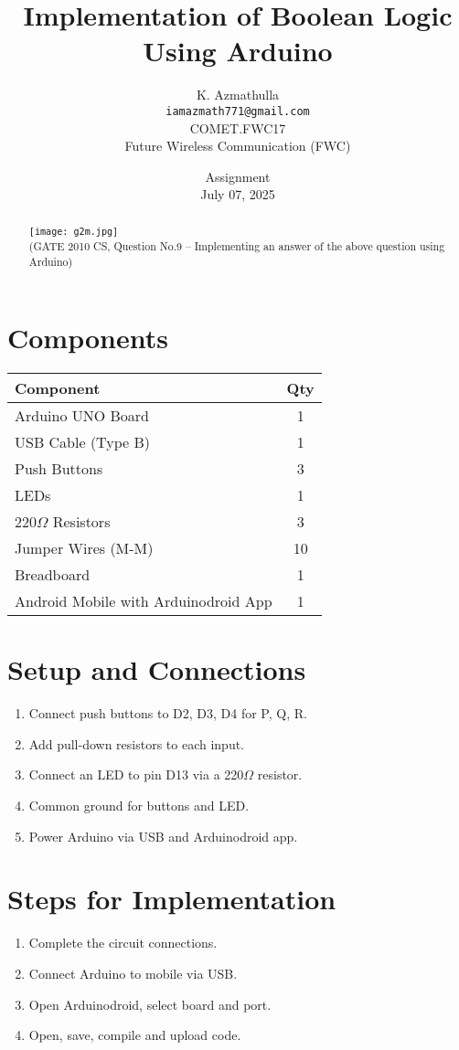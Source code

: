 \documentclass[12pt]{article}
\title{Implementation of Boolean Logic Using Arduino}
\author{K. Azmathulla\\\texttt{iamazmath771@gmail.com}\\COMET.FWC17\\Future Wireless Communication (FWC)}
\date{Assignment\\July 07, 2025}
\begin{document}
\maketitle

\begin{abstract}
\texttt{[image: g2m.jpg]} \\[0.5em]
(GATE 2010 CS, Question No.9 – Implementing an answer of the above question using Arduino)
\end{abstract}

\section{Components}

\begin{tabular}{|l|c|}
\hline
\textbf{Component} & \textbf{Qty} \\
\hline
Arduino UNO Board & 1 \\
USB Cable (Type B) & 1 \\
Push Buttons & 3 \\
LEDs & 1 \\
220$\Omega$ Resistors & 3 \\
Jumper Wires (M-M) & 10 \\
Breadboard & 1 \\
Android Mobile with Arduinodroid App & 1 \\
\hline
\end{tabular}

\section{Setup and Connections}
\begin{enumerate}
    \item Connect push buttons to D2, D3, D4 for P, Q, R.
    \item Add pull-down resistors to each input.
    \item Connect an LED to pin D13 via a 220$\Omega$ resistor.
    \item Common ground for buttons and LED.
    \item Power Arduino via USB and Arduinodroid app.
\end{enumerate}

\section{Steps for Implementation}
\begin{enumerate}
    \item Complete the circuit connections.
    \item Connect Arduino to mobile via USB.
    \item Open Arduinodroid, select board and port.
    \item Open, save, compile and upload code.
\end{enumerate}
\end{document}
